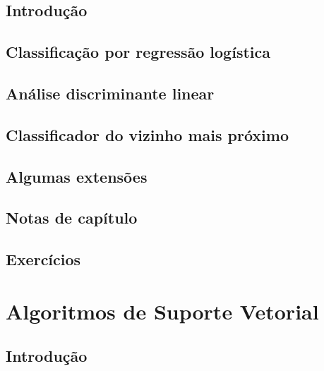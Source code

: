 \documentclass[
]{latex/krantz}
\theoremstyle{definition}
\theoremstyle{definition}
\theoremstyle{definition}
\theoremstyle{definition}
\theoremstyle{remark}
\begin{document}
\hypertarget{introduuxe7uxe3o-7}{%
\section{Introdução}\label{introduuxe7uxe3o-7}}

\hypertarget{classificauxe7uxe3o-por-regressuxe3o-loguxedstica}{%
\section{Classificação por regressão logística}\label{classificauxe7uxe3o-por-regressuxe3o-loguxedstica}}

\hypertarget{anuxe1lise-discriminante-linear}{%
\section{Análise discriminante linear}\label{anuxe1lise-discriminante-linear}}

\hypertarget{classificador-do-vizinho-mais-pruxf3ximo}{%
\section{Classificador do vizinho mais próximo}\label{classificador-do-vizinho-mais-pruxf3ximo}}

\hypertarget{algumas-extensuxf5es}{%
\section{Algumas extensões}\label{algumas-extensuxf5es}}

\hypertarget{notas-de-capuxedtulo-7}{%
\section{Notas de capítulo}\label{notas-de-capuxedtulo-7}}

\hypertarget{exercuxedcios-7}{%
\section{Exercícios}\label{exercuxedcios-7}}

\hypertarget{algoritmos-de-suporte-vetorial}{%
\chapter{Algoritmos de Suporte Vetorial}\label{algoritmos-de-suporte-vetorial}}

\hypertarget{introduuxe7uxe3o-8}{%
\section{Introdução}\label{introduuxe7uxe3o-8}}
\end{document}
